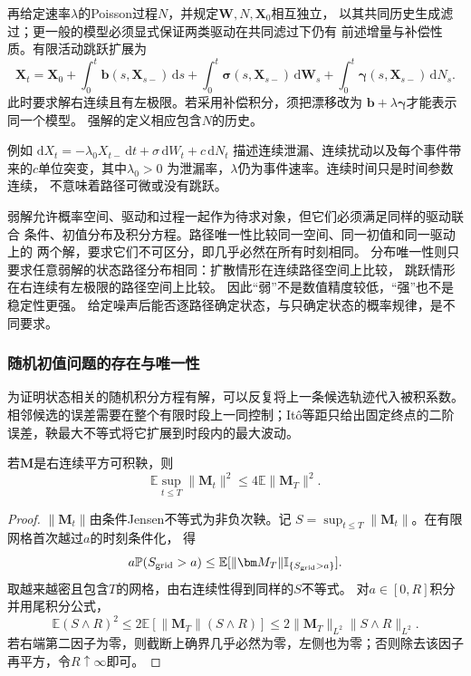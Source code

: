 再给定速率$\lambda$的Poisson过程$N$，并规定$\bm W,N,\bm X_0$相互独立，
以其共同历史生成滤过；更一般的模型必须显式保证两类驱动在共同滤过下仍有
前述增量与补偿性质。有限活动跳跃扩展为
\begin{equation}
 \bm X_t=\bm X_0+\int_0^t\bm b(s,\bm X_{s-})\,\mathrm ds
      +\int_0^t\bm\sigma(s,\bm X_{s-})\,\mathrm d\bm W_s
      +\int_0^t\bm\gamma(s,\bm X_{s-})\,\mathrm dN_s.
 \label{eq:action-state-jump-sde}
\end{equation}
此时要求解右连续且有左极限。若采用补偿积分，须把漂移改为
$\bm b+\lambda\bm\gamma$才能表示同一个模型。
强解的定义相应包含$N$的历史。

例如
$\mathrm dX_t=-\lambda_0X_{t-}\,\mathrm dt+\sigma\,\mathrm dW_t
                         +c\,\mathrm dN_t$
描述连续泄漏、连续扰动以及每个事件带来的$c$单位突变，其中$\lambda_0>0$
为泄漏率，$\lambda$仍为事件速率。连续时间只是时间参数连续，
不意味着路径可微或没有跳跃。

弱解允许概率空间、驱动和过程一起作为待求对象，但它们必须满足同样的驱动联合
条件、初值分布及积分方程。路径唯一性比较同一空间、同一初值和同一驱动上的
两个解，要求它们不可区分，即几乎必然在所有时刻相同。
分布唯一性则只要求任意弱解的状态路径分布相同：扩散情形在连续路径空间上比较，
跳跃情形在右连续有左极限的路径空间上比较。
因此“弱”不是数值精度较低，“强”也不是稳定性更强。
给定噪声后能否逐路径确定状态，与只确定状态的概率规律，是不同要求。

\subsubsection{随机初值问题的存在与唯一性}
为证明状态相关的随机积分方程有解，可以反复将上一条候选轨迹代入被积系数。相邻候选的误差需要在整个有限时段上一同控制；Itô等距只给出固定终点的二阶误差，鞅最大不等式将它扩展到时段内的最大波动。
\begin{lemma}[二阶鞅最大不等式]
 \label{lem:action-state-doob-l2}
 若$\bm M$是右连续平方可积鞅，则
 \[
   \mathbb E\sup_{t\leq T}\|\bm M_t\|^2
      \leq4\mathbb E\|\bm M_T\|^2.
 \]
\end{lemma}
\begin{proof}
 $\|\bm M_t\|$由条件Jensen不等式为非负次鞅。记
 $S=\sup_{t\leq T}\|\bm M_t\|$。在有限网格首次越过$a$的时刻条件化，
 得
 \[
  a\mathbb P(S_{\rm grid}>a)
    \leq\mathbb E[\|\bm M_T\|\mathbb I_{\{S_{\rm grid}>a\}}].
 \]
 取越来越密且包含$T$的网格，由右连续性得到同样的$S$不等式。
 对$a\in[0,R]$积分并用尾积分公式，
 \[
  \mathbb E(S\wedge R)^2
    \leq2\mathbb E[\|\bm M_T\|(S\wedge R)]
    \leq2\|\bm M_T\|_{L^2}\|S\wedge R\|_{L^2}.
 \]
 若右端第二因子为零，则截断上确界几乎必然为零，左侧也为零；否则除去该因子再平方，令$R\uparrow\infty$即可。
\end{proof}

